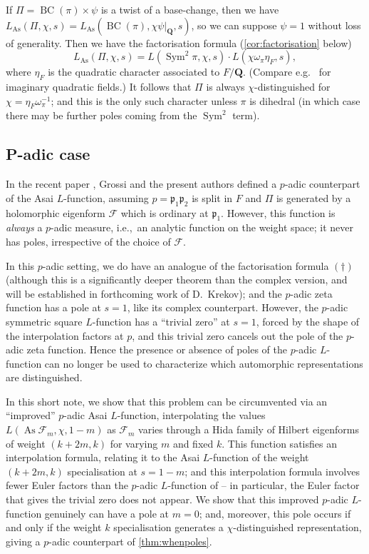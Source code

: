 \documentclass[a4paper,10pt]{amsart}
\theoremstyle{plain}
\theoremstyle{remark}
\DeclareMathOperator{\Sym}{Sym}
\DeclareMathOperator{\BC}{BC}
\DeclareMathOperator{\As}{As}
\newcommand{\QQ}{\mathbf{Q}}
\newcommand{\cF}{\mathcal{F}}
\newcommand{\pp}{\mathfrak{p}}
\numberwithin{equation}{section}
\begin{document}
  If $\Pi = \BC(\pi) \times \psi$ is a twist of a base-change, then we have $L_{\As}(\Pi, \chi, s) = L_{\As}(\BC(\pi), \chi\psi|_{\QQ}, s)$, so we can suppose $\psi = 1$ without loss of generality. Then we have the factorisation formula (\cref{cor:factorisation} below)
  \[ \tag{\dag} L_{\As}(\Pi, \chi, s) = L(\Sym^2 \pi, \chi, s) \cdot L(\chi \omega_{\pi} \eta_F, s), \]
  where $\eta_F$ is the quadratic character associated to $F / \QQ$. (Compare e.g.~\cite[Ch.~4, Cor.~1]{ghatethesis} for imaginary quadratic fields.) It follows that $\Pi$ is always $\chi$-distinguished for $\chi = \eta_F\omega_{\pi}^{-1}$; and this is the only such character unless $\pi$ is dihedral (in which case there may be further poles coming from the $\Sym^2$ term).

 \subsection{P-adic case}

  In the recent paper \cite{grossiloefflerzerbesLfunct}, Grossi and the present authors defined a $p$-adic counterpart of the Asai $L$-function, assuming $p = \pp_1 \pp_2$ is split in $F$ and $\Pi$ is generated by a holomorphic eigenform $\cF$ which is ordinary at $\pp_1$. However, this function is \emph{always} a $p$-adic measure, i.e.,~an analytic function on the weight space; it never has poles, irrespective of the choice of $\cF$.

  In this $p$-adic setting, we do have an analogue of the factorisation formula $(\dag)$ (although this is a significantly deeper theorem than the complex version, and will be established in forthcoming work of D.~Krekov); and the $p$-adic zeta function has a pole at $s = 1$, like its complex counterpart. However, the $p$-adic symmetric square $L$-function has a ``trivial zero'' at $s = 1$, forced by the shape of the interpolation factors at $p$, and this trivial zero cancels out the pole of the $p$-adic zeta function. Hence the presence or absence of poles of the $p$-adic $L$-function can no longer be used to characterize which automorphic representations are distinguished.

  In this short note, we show that this problem can be circumvented via an ``improved'' $p$-adic Asai $L$-function, interpolating the values $L(\As \cF_m, \chi, 1-m)$ as $\cF_m$ varies through a Hida family of Hilbert eigenforms of weight $(k + 2m, k)$ for varying $m$ and fixed $k$. This function satisfies an interpolation formula, relating it to the Asai $L$-function of the weight $(k + 2m, k)$ specialisation at $s = 1 - m$; and this interpolation formula involves fewer Euler factors than the $p$-adic $L$-function of \cite{grossiloefflerzerbesLfunct} -- in particular, the Euler factor that gives the trivial zero does not appear. We show that this improved $p$-adic $L$-function genuinely can have a pole at $m = 0$; and, moreover, this pole occurs if and only if the weight $k$ specialisation generates a $\chi$-distinguished representation, giving a $p$-adic counterpart of \cref{thm:whenpoles}.
\end{document}
